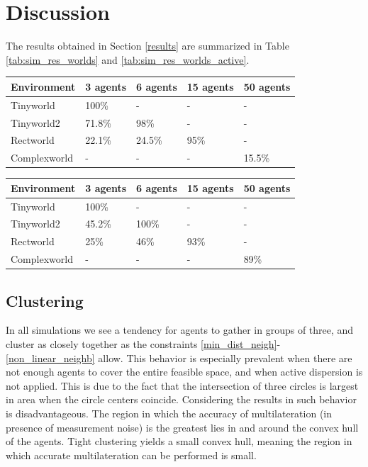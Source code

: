 \section{Discussion}
The results obtained in Section \ref{results} are summarized in Table \ref{tab:sim_res_worlds} and \ref{tab:sim_res_worlds_active}.
\begin{center}
  \begin{tabular}{l|l|l|l|l}
    Environment & 3 agents & 6 agents & 15 agents & 50 agents\\
    \hline
    Tinyworld & 100\% & - & - & - \\ 
    Tinyworld2 & 71.8\% & 98\% & - & - \\
    Rectworld &  22.1\% & 24.5\% & 95\% & - \\
    Complexworld & - & - & - & 15.5\% \\
  \end{tabular}
\end{center}
\begin{center}
  \begin{tabular}{l|l|l|l|l}
    Environment & 3 agents & 6 agents & 15 agents & 50 agents\\
    \hline
    Tinyworld & 100\% & - & - & - \\ 
    Tinyworld2 & 45.2\% & 100\% & - & - \\
    Rectworld &  25\% & 46\% & 93\% & - \\
    Complexworld & - & - & - & 89\% \\
  \end{tabular}
\end{center}

\subsection{Clustering}
In all simulations we see a tendency for agents to gather in groups of three, and cluster as closely together as the constraints \eqref{min_dist_neigh}-\eqref{non_linear_neighb} allow.  
This behavior is especially prevalent when there are not enough agents to cover the entire feasible space, and when active dispersion is not applied. This is due to 
the fact that the intersection of three circles is largest in area when the circle centers coincide. Considering the results in \cite{CRB_multilat} such behavior is disadvantageous. The region in which
the accuracy of multilateration (in presence of measurement noise) is the greatest lies in and around the convex hull of the agents. Tight clustering yields a small convex hull, 
meaning the region in which accurate multilateration can be performed is small.


